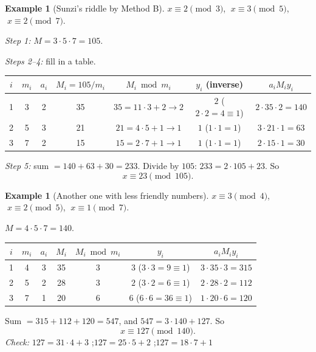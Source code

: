 \documentclass[11pt]{article}
\theoremstyle{definition}
\newtheorem{example}[theorem]{Example}
\theoremstyle{remark}
\begin{document}
\begin{example}[Sunzi's riddle by Method B]\label{ex:qs-formula1}
$x\equiv 2\pmod 3$, $\;x\equiv 3\pmod 5$, $\;x\equiv 2\pmod 7$.

\emph{Step 1:} $M=3\cdot5\cdot7=105$.

\emph{Steps 2--4:} fill in a table.
\begin{center}
\renewcommand{\arraystretch}{1.25}
\begin{tabular}{ccccccc}
\toprule
$i$ & $m_i$ & $a_i$ & $M_i=105/m_i$ & $M_i \bmod m_i$ & $y_i$ (inverse) & $a_iM_iy_i$ \\
\midrule
1 & 3 & 2 & 35 & $35=11\cdot3+2\to 2$ & $2$ \quad($2\cdot2=4\equiv1$) & $2\cdot35\cdot2=140$ \\
2 & 5 & 3 & 21 & $21=4\cdot5+1\to 1$ & $1$ \quad($1\cdot1=1$) & $3\cdot21\cdot1=63$ \\
3 & 7 & 2 & 15 & $15=2\cdot7+1\to 1$ & $1$ \quad($1\cdot1=1$) & $2\cdot15\cdot1=30$ \\
\bottomrule
\end{tabular}
\end{center}

\emph{Step 5:} sum $=140+63+30=233$. Divide by $105$: $233=2\cdot105+23$. So
\[
x\equiv 23\pmod{105}.
\]
\end{example}

\begin{example}[Another one with less friendly numbers]\label{ex:qs-formula2}
$x\equiv 3\pmod 4$, $\;x\equiv 2\pmod 5$, $\;x\equiv 1\pmod 7$.

$M=4\cdot5\cdot7=140$.
\begin{center}
\renewcommand{\arraystretch}{1.25}
\begin{tabular}{ccccccc}
\toprule
$i$ & $m_i$ & $a_i$ & $M_i$ & $M_i \bmod m_i$ & $y_i$ & $a_iM_iy_i$ \\
\midrule
1 & 4 & 3 & 35 & 3 & $3$ \quad($3\cdot3=9\equiv1$) & $3\cdot35\cdot3=315$ \\
2 & 5 & 2 & 28 & 3 & $2$ \quad($3\cdot2=6\equiv1$) & $2\cdot28\cdot2=112$ \\
3 & 7 & 1 & 20 & 6 & $6$ \quad($6\cdot6=36\equiv1$) & $1\cdot20\cdot6=120$ \\
\bottomrule
\end{tabular}
\end{center}
Sum $=315+112+120=547$, and $547=3\cdot140+127$. So
\[
x\equiv 127\pmod{140}.
\]
\emph{Check:} $127=31\cdot4+3$ \checkmark;\quad $127=25\cdot5+2$ \checkmark;\quad $127=18\cdot7+1$ \checkmark
\end{example}
\end{document}
